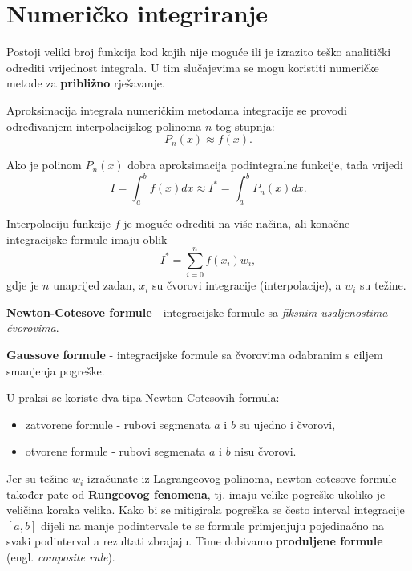 \section{Numeričko integriranje}

Postoji veliki broj funkcija kod kojih nije moguće ili je izrazito teško
analitički odrediti vrijednost integrala. U tim slučajevima se mogu koristiti
numeričke metode za \textbf{približno} rješavanje.

Aproksimacija integrala numeričkim metodama integracije se provodi određivanjem
interpolacijskog polinoma $n$-tog stupnja:
$$
P_n(x) \approx f(x).
$$

Ako je polinom $P_n(x)$ dobra aproksimacija podintegralne funkcije, tada vrijedi
$$
I = \int_a^b f(x) dx \approx I^* = \int_a^b P_n(x) dx.
$$

Interpolaciju funkcije $f$ je moguće odrediti na više načina, ali konačne
integracijske formule imaju oblik
$$
I^* = \sum_{i=0}^n f(x_i) w_i,
$$
gdje je $n$ unaprijed zadan, $x_i$ su čvorovi integracije (interpolacije), a
$w_i$ su težine.

\bigskip

\textbf{Newton-Cotesove formule} - integracijske formule sa \textit{fiksnim usaljenostima čvorovima}.

\textbf{Gaussove formule} - integracijske formule sa čvorovima odabranim s ciljem smanjenja pogreške.

\bigskip
\noindent
U praksi se koriste dva tipa Newton-Cotesovih formula:
\begin{itemize}
    \item zatvorene formule - rubovi segmenata $a$ i $b$ su ujedno i čvorovi,
    \item otvorene formule - rubovi segmenata $a$ i $b$ nisu čvorovi.
\end{itemize}

\bigskip
\noindent
Jer su težine $w_i$ izračunate iz Lagrangeovog polinoma, newton-cotesove formule
također pate od \textbf{Rungeovog fenomena}, tj. imaju velike pogreške ukoliko
je veličina koraka velika. Kako bi se mitigirala pogreška se često interval
integracije $[a,b]$ dijeli na manje podintervale te se formule primjenjuju
pojedinačno na svaki podinterval a rezultati zbrajaju. Time dobivamo
\textbf{produljene formule} (engl. \textit{composite rule}).
